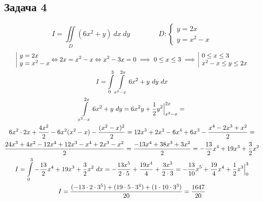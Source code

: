 \documentclass[a4paper,fleqn,12pt]{article}
\theoremstyle{definition}
\begin{document}
\subsection*{Задача 4}
$$I = \iint\limits_D (6x^2 + y) \ dx \ dy \qquad \qquad D: \begin{cases} y=2x \\ y = x^2 - x \end{cases}$$
\begin{gather*}
\begin{array}{|l@{}} y=2x \\ y = x^2 - x \end{array} \Leftrightarrow 2x = x^2 - x \Leftrightarrow x^2 - 3x = 0 \implies 0 \leq x \leq 3 \implies \begin{array}{|l@{}} 0 \leq x \leq 3 \\  x^2 - x \leq y \leq2x \end{array} \\
I = \int\limits_0 ^3 \int\limits_{x^2 - x} ^{2x} 6x^2 + y \ dy \ dx \\
\int\limits_{x^2 - x} ^{2x} 6x^2 + y \ dy = 6x^2y + \frac{1}{2} y^2 \Big|_{x^2 - x} ^{2x} = \\
6x^2\cdot 2x + \frac{4x^2}{2} - 6x^2(x^2-x) - \frac{(x^2-x)^2}{2} = 12x^3 + 2x^2 - 6x^4 + 6x^3 - \frac{x^4 - 2x^3 +x^2}{2} = \\
\frac{24x^3 + 4x^2 - 12x^4 + 12x^3 - x^4 + 2x^3 - x^2}{2} = \frac{-13 x^4 + 38x^3 + 3x^2}{2} = -\frac{13}{2} x^4 + 19x^3 + \frac{3}{2} x^2 \\
I = \int\limits_0 ^3 -\frac{13}{2} x^4 + 19x^3 + \frac{3}{2} x^2  \ dx = -\frac{13x^5}{2 \cdot 5} + \frac{19x^4}{4} + \frac{3x^3}{2 \cdot 3} = - \frac{13}{10} x^5 + \frac{19}{4} x^4 + \frac{1}{2} x^3 \Big|_0 ^3 \\
I = \frac{(-13\cdot 2 \cdot 3^5) + (19 \cdot 5 \cdot 3^4) + (1 \cdot 10 \cdot 3^3)}{20} = \frac{1647}{20}
\end{gather*}
\end{document}
